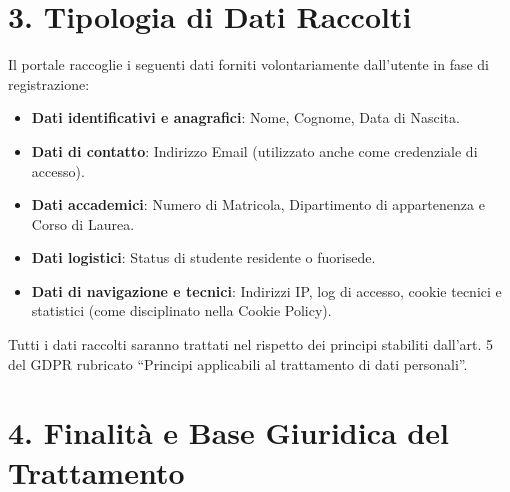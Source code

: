 \documentclass[a4paper,11pt]{article}
\begin{document}
\section*{3. Tipologia di Dati Raccolti}

Il portale raccoglie i seguenti dati forniti volontariamente dall’utente in fase di registrazione:
\begin{itemize}[leftmargin=*]
    \item \textbf{Dati identificativi e anagrafici}: Nome, Cognome, Data di Nascita.
    \item \textbf{Dati di contatto}: Indirizzo Email (utilizzato anche come credenziale di accesso).
    \item \textbf{Dati accademici}: Numero di Matricola, Dipartimento di appartenenza e Corso di Laurea.
    \item \textbf{Dati logistici}: Status di studente residente o fuorisede.
    \item \textbf{Dati di navigazione e tecnici}: Indirizzi IP, log di accesso, cookie tecnici e statistici (come disciplinato nella Cookie Policy).
\end{itemize}

Tutti i dati raccolti saranno trattati nel rispetto dei principi stabiliti dall'art. 5 del GDPR rubricato ``Principi applicabili al trattamento di dati personali''.

\section*{4. Finalità e Base Giuridica del Trattamento}
\end{document}
